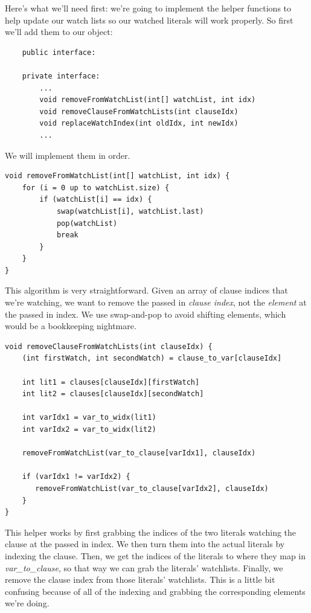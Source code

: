 \documentclass[../main.tex]{subfiles}
\begin{document}
Here's what we'll need first: we're going to implement the helper functions to help update 
our watch lists so our watched literals will work properly. So first we'll add them to our 
object:

\begin{lstlisting}
    public interface:

    private interface:
        ...
        void removeFromWatchList(int[] watchList, int idx)
        void removeClauseFromWatchLists(int clauseIdx)
        void replaceWatchIndex(int oldIdx, int newIdx)
        ...
\end{lstlisting}
\noindent
We will implement them in order.

\begin{lstlisting}
void removeFromWatchList(int[] watchList, int idx) {
    for (i = 0 up to watchList.size) {
        if (watchList[i] == idx) {
            swap(watchList[i], watchList.last)
            pop(watchList)
            break
        }
    }
}
\end{lstlisting}
This algorithm is very straightforward. Given an array of clause indices that 
we're watching, we want to remove the passed in \textit{clause index}, not 
the \textit{element} at the passed in index. We use swap-and-pop to avoid 
shifting elements, which would be a bookkeeping nightmare.

\begin{lstlisting}
void removeClauseFromWatchLists(int clauseIdx) {
    (int firstWatch, int secondWatch) = clause_to_var[clauseIdx]

    int lit1 = clauses[clauseIdx][firstWatch]
    int lit2 = clauses[clauseIdx][secondWatch]

    int varIdx1 = var_to_widx(lit1)
    int varIdx2 = var_to_widx(lit2)

    removeFromWatchList(var_to_clause[varIdx1], clauseIdx)

    if (varIdx1 != varIdx2) {
       removeFromWatchList(var_to_clause[varIdx2], clauseIdx)
    }
}
\end{lstlisting}
\noindent
This helper works by first grabbing the indices of the two literals watching 
the clause at the passed in index. We then turn them into the actual literals 
by indexing the clause. Then, we get the indices of the literals to where they 
map in \textit{var\_to\_clause}, so that way we can grab the literals' watchlists.
Finally, we remove the clause index from those literals' watchlists. This is a 
little bit confusing because of all of the indexing and grabbing the corresponding 
elements we're doing. 
\end{document}

